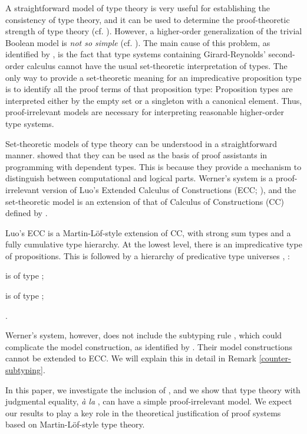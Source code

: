 \documentclass{LMCS}
\theoremstyle{plain}
\theoremstyle{definition}
\begin{document}
A straightforward model of type theory is very useful for establishing the consistency of type theory, and it can be used to determine the proof-theoretic strength of type theory (cf. \cite{aczel-relating,dybjer,dybjer00,werner-set}). However, a higher-order generalization of the trivial Boolean model is {\it not so simple} (cf. \cite{miwe}). The main cause of this problem, as identified by \cite{reynolds}, is the fact that type systems containing Girard-Reynolds' second-order calculus cannot have the usual set-theoretic interpretation of types. The only way to provide a set-theoretic meaning for an impredicative proposition type is to identify all the proof terms of that proposition type: Proposition types are interpreted either by the empty set or a singleton with a canonical element. Thus, proof-irrelevant models are necessary for interpreting reasonable higher-order type systems.

Set-theoretic models of type theory can be understood in a straightforward manner. \cite{werner-proof} showed that they can be used as the basis of proof assistants in programming with dependent types. This is because they provide a mechanism to distinguish between computational and logical parts. 
Werner's system is a proof-irrelevant version of Luo's Extended Calculus of Constructions (ECC; \citep{luo89-lics}), and the set-theoretic model is an extension of that of Calculus of Constructions (CC) defined by \cite{miwe}.

Luo's ECC is a Martin-L\"of-style extension of CC, with strong sum types and a fully cumulative type hierarchy. At the lowest level, there is an impredicative type  of propositions. This is followed by a hierarchy of predicative type universes , :

\begin{iteMize}{}
\item  is of type ;

\item  is of type ;

\item .
\end{iteMize}

Werner's system, however, does not include the subtyping rule , which could complicate the model construction, as identified by \cite{miwe}. Their model constructions cannot be extended to ECC. We will explain this in detail in Remark \ref{counter-subtyping}.

In this paper, we investigate the inclusion of , and we show that type theory with judgmental equality, {\it \`{a} la} \cite{ml-84}, can have a simple proof-irrelevant model. We expect our results to play a key role in the theoretical justification of proof systems based on Martin-L\"of-style type theory.
\end{document}
